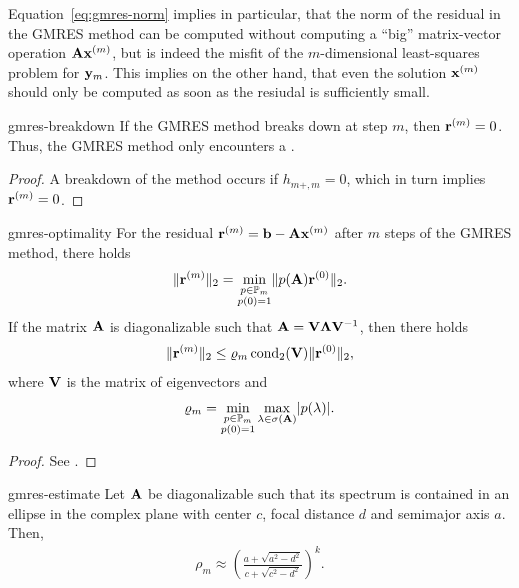 \begin{remark}
  Equation~\eqref{eq:gmres-norm} implies in particular, that the norm
  of the residual in the GMRES method can be computed without
  computing a ``big'' matrix-vector operation $\mathbf A\mathbf x^{(m)}$, but is
  indeed the misfit of the $m$-dimensional least-squares problem for
  $\mathbf y_m$. This implies on the other hand, that even the solution
  $\mathbf x^{(m)}$ should only be computed as soon as the resiudal is
  sufficiently small.
\end{remark}

\begin{Lemma}{gmres-breakdown}
  If the GMRES method breaks down at step $m$, then
  $\mathbf r^{(m)}=0$. Thus, the GMRES method only encounters a
  .
\end{Lemma}

\begin{proof}
  A breakdown of the method occurs if $h_{m+,m} = 0$, which in turn
  implies $\mathbf r^{(m)} = 0$.
\end{proof}

\begin{Theorem}{gmres-optimality}
  For the residual $\mathbf r^{(m)} = \mathbf b-\mathbf A\mathbf x^{(m)}$ after $m$  steps of
  the GMRES method, there holds
  \begin{gather}
    \lVert\mathbf r^{(m)}\rVert_2 = \min_{\substack{p\in\mathbb P_m\\p(0) = 1}}
    \lVert p(\mathbf A)\mathbf r^{(0)}\rVert_2.
  \end{gather}
  If the matrix $\mathbf A$ is diagonalizable such that $\mathbf A=\mathbf V\boldsymbol\Lambda\mathbf V^{-1}$, then there holds
    \begin{gather}
    \lVert\mathbf r^{(m)}\rVert_2 \le \varrho_m \operatorname{cond}_2(\mathbf V) \lVert\mathbf r^{(0)}\rVert_2,
  \end{gather}
  where $\mathbf V$ is the matrix of eigenvectors and
  \begin{gather}
    \varrho_m = \min_{\substack{p\in\mathbb P_m\\p(0) = 1}} \max_{\lambda\in\sigma(\mathbf A)} \lvert p(\lambda)\rvert.
  \end{gather}
\end{Theorem}

\begin{proof}
  See \cite[Proposition 6.32]{Saad00}.
\end{proof}

\begin{Corollary}{gmres-estimate}
  Let $\mathbf A$ be diagonalizable such that its spectrum is contained in
  an ellipse in the complex plane with center $c$, focal distance $d$
  and semimajor axis $a$. Then,
  \begin{gather}
     \rho_m \approx \left(
      \frac{a+\sqrt{a^2-d^2}}{c+\sqrt{c^2-d^2}}
      \right)^k.
  \end{gather}
\end{Corollary}

